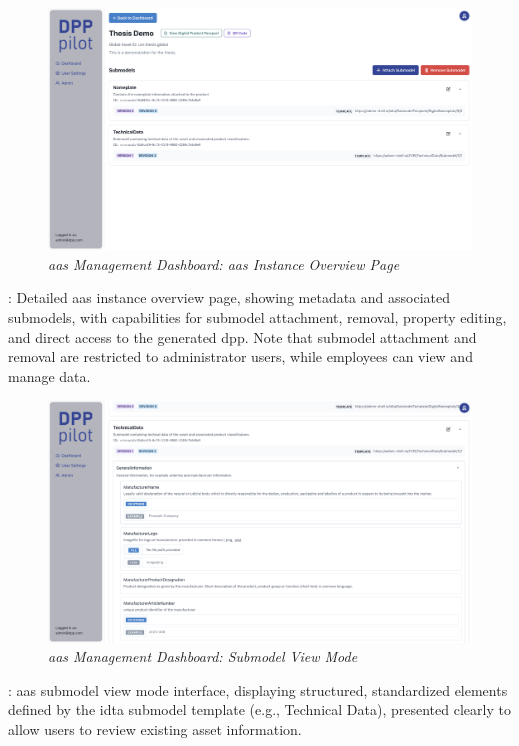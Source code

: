 \begin{figure}[H]
  \centering
  \includegraphics[width=\textwidth]{figures/pilot_interface_3.png}
  \caption{%
    \textit{\ac{aas} Management Dashboard: \ac{aas} Instance Overview Page} 
  }
  \label{fig:pilot_interface_3}
\end{figure}

: Detailed \ac{aas} instance overview page, showing metadata and associated submodels, with capabilities for submodel attachment, removal, property editing, and direct access to the generated \ac{dpp}. Note that submodel attachment and removal are restricted to administrator users, while employees can view and manage data.

\begin{figure}[H]
  \centering
  \includegraphics[width=\textwidth]{figures/pilot_interface_5.png}
  \caption{%
    \textit{\ac{aas} Management Dashboard: Submodel View Mode} 
  }
  \label{fig:pilot_interface_5}
\end{figure}

: \ac{aas} submodel view mode interface, displaying structured, standardized elements defined by the \ac{idta} submodel template (e.g., Technical Data), presented clearly to allow users to review existing asset information.

